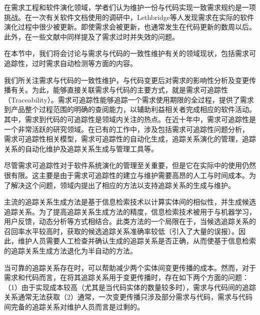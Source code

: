 在需求工程和软件演化领域，学者们认为维护一份与代码实现一致需求规约是一项挑战。在一次有关软件文档使用的调研中，Lethbridge等人\cite{lethbridge2003software}发现需求在实际的软件演化过程中很少被更新。即使需求会被更新，也通常发生在代码更新的数周以后。此外，在一些文献\cite{bennett2000software,mens2005challenges}中同样提及了需求过时并失效的问题。

在本节中，我们将会讨论与需求与代码的一致性维护有关的领域现状，包括需求可追踪性，过时需求自动检测等方面的内容。

我们所关注需求与代码的一致性维护，与代码变更后对需求的影响性分析及变更传播有关。为此，能够直接关联需求与代码的主要方式，就是需求可追踪性（Traceability）。需求可追踪性能够追踪一个需求使用期限的全过程，提供了需求到产品整个过程范围的明确的查阅能力，以辅助利益相关者完成相应的软件活动。其中，需求到代码的可追踪性是领域内关注的热点。在近十年中，需求可追踪性是一个非常活跃的研究领域。在已有的工作中，涉及包括需求可追踪性问题分析\cite{gotel1994analysis}， 需求可追踪性相关模型\cite{ramesh2001toward}，需求可追踪性的自动化生成，追踪关系演化的管理\cite{cleland2003event}，追踪关系的自动化维护\cite{mader2012towards}及追踪关系生成与管理工具\cite{hayes2007requirements}等。

尽管需求可追踪性对于软件系统演化的管理至关重要，但是它在实际中的使用仍然很有限。这主要是由于需求可追踪性的建立与维护需要高昂的人工与时间成本。为了解决这个问题，领域内提出了相应的方法以支持追踪关系的生成与维护。

主流的追踪关系生成方法是基于信息检索技术以计算实体间的相似性，并生成候选追踪关系\cite{antoniol2002recovering,hayes2006advancing,marcus2003recovering,cleland2005utilizing}。为了提高追踪关系生成方法的精度，信息检索技术被用于与机器学习\cite{cleland2010machine}，用户反馈\cite{panichella2013and}，动态分析\cite{eaddy2008cerberus}等方式相结合。此类方法的一个局限在于，当候选追踪关系的召回率水平较高时，获取的候选追踪关系准确率较低（引入了大量的误报）。因此，维护人员需要人工检查并确认生成的追踪关系是否正确，从而使基于信息检索的追踪关系生成方法退化为半自动的方法。

当可靠的追踪关系存在时，可以帮助减少两个实体间变更传播的成本。然而，对于需求和代码而言，在将其追踪关系用于变更传播时，存在如下两个方面的问题：（1）由于实现成本较高（尤其是当代码实体的数量较多时），需求与代码间的追踪关系通常无法获取（2）通常，一次变更传播只涉及部分需求与代码，需求与代码间完备的追踪关系对维护人员而言是过剩的。

